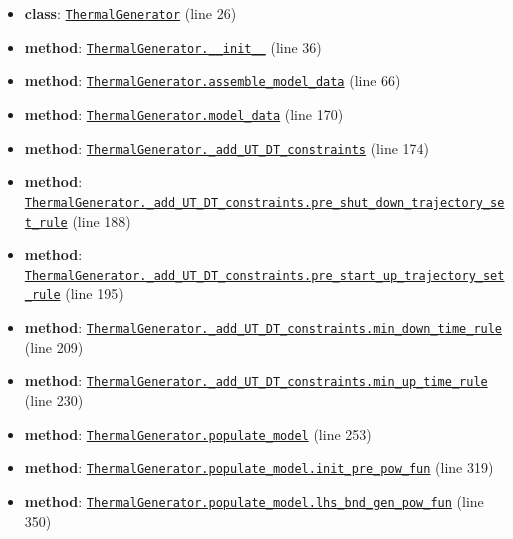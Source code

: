 \documentclass[11pt]{report}
\begin{document}
\begin{itemize}[leftmargin=*]
  \item \textbf{class}: \hyperref[def:examples-thermal_generator.py:ThermalGenerator:L26]{\texttt{ThermalGenerator}} (line 26)
  \item \textbf{method}: \hyperref[def:examples-thermal_generator.py:ThermalGenerator.__init__:L36]{\texttt{ThermalGenerator.\_\_init\_\_}} (line 36)
  \item \textbf{method}: \hyperref[def:examples-thermal_generator.py:ThermalGenerator.assemble_model_data:L66]{\texttt{ThermalGenerator.assemble\_model\_data}} (line 66)
  \item \textbf{method}: \hyperref[def:examples-thermal_generator.py:ThermalGenerator.model_data:L170]{\texttt{ThermalGenerator.model\_data}} (line 170)
  \item \textbf{method}: \hyperref[def:examples-thermal_generator.py:ThermalGenerator._add_UT_DT_constraints:L174]{\texttt{ThermalGenerator.\_add\_UT\_DT\_constraints}} (line 174)
  \item \textbf{method}: \hyperref[def:examples-thermal_generator.py:ThermalGenerator._add_UT_DT_constraints.pre_shut_down_trajectory_set_rule:L188]{\texttt{ThermalGenerator.\_add\_UT\_DT\_constraints.pre\_shut\_down\_trajectory\_set\_rule}} (line 188)
  \item \textbf{method}: \hyperref[def:examples-thermal_generator.py:ThermalGenerator._add_UT_DT_constraints.pre_start_up_trajectory_set_rule:L195]{\texttt{ThermalGenerator.\_add\_UT\_DT\_constraints.pre\_start\_up\_trajectory\_set\_rule}} (line 195)
  \item \textbf{method}: \hyperref[def:examples-thermal_generator.py:ThermalGenerator._add_UT_DT_constraints.min_down_time_rule:L209]{\texttt{ThermalGenerator.\_add\_UT\_DT\_constraints.min\_down\_time\_rule}} (line 209)
  \item \textbf{method}: \hyperref[def:examples-thermal_generator.py:ThermalGenerator._add_UT_DT_constraints.min_up_time_rule:L230]{\texttt{ThermalGenerator.\_add\_UT\_DT\_constraints.min\_up\_time\_rule}} (line 230)
  \item \textbf{method}: \hyperref[def:examples-thermal_generator.py:ThermalGenerator.populate_model:L253]{\texttt{ThermalGenerator.populate\_model}} (line 253)
  \item \textbf{method}: \hyperref[def:examples-thermal_generator.py:ThermalGenerator.populate_model.init_pre_pow_fun:L319]{\texttt{ThermalGenerator.populate\_model.init\_pre\_pow\_fun}} (line 319)
  \item \textbf{method}: \hyperref[def:examples-thermal_generator.py:ThermalGenerator.populate_model.lhs_bnd_gen_pow_fun:L350]{\texttt{ThermalGenerator.populate\_model.lhs\_bnd\_gen\_pow\_fun}} (line 350)

\end{itemize}
\end{document}
